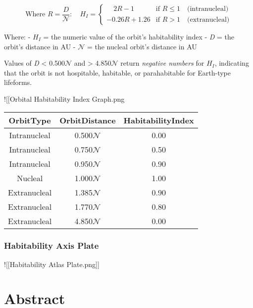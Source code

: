 \documentclass[
  letterpaper,
]{book}
\begin{document}
\[
\text{Where } R = \dfrac{D}{\mathcal{N}}: \quad H_I =
\begin{cases}
  \quad 2R - 1 & \text{if } R \leq 1 \quad \text{(intranucleal)} \\
  -0.26R + 1.26 & \text{if } R \gt 1 \quad \text{(extranucleal)}
\end{cases}
\]

Where: - \(H_I\) = the numeric value of the orbit's habitability index -
\emph{D} = the orbit's distance in AU - \(\mathcal{N}\) = the nucleal
orbit's distance in AU

Values of \emph{D} \textless{} 0.500\(\mathcal{N}\) and \textgreater{}
4.850\(\mathcal{N}\) return \emph{negative numbers} for \(H_I\),
indicating that the orbit is not hospitable, habitable, or parahabitable
for Earth-type lifeforms.

!{[}{[}Orbital Habitability Index Graph.png\textbar400{]}{]}

\begin{longtable}[]{@{}ccc@{}}
\toprule\noalign{}
OrbitType & OrbitDistance & HabitabilityIndex \\
\midrule\noalign{}
\endhead
\bottomrule\noalign{}
\endlastfoot
Intranucleal & 0.500\(\mathcal{N}\) & 0.00 \\
Intranucleal & 0.750\(\mathcal{N}\) & 0.50 \\
Intranucleal & 0.950\(\mathcal{N}\) & 0.90 \\
Nucleal & 1.000\(\mathcal{N}\) & 1.00 \\
Extranucleal & 1.385\(\mathcal{N}\) & 0.90 \\
Extranucleal & 1.770\(\mathcal{N}\) & 0.80 \\
Extranucleal & 4.850\(\mathcal{N}\) & 0.00 \\
\end{longtable}

\subsubsection{Habitability Axis Plate}\label{habitability-axis-plate}

!{[}{[}Habitability Atlas Plate.png{]}{]}

\section{Abstract}\label{abstract-14}
\end{document}
